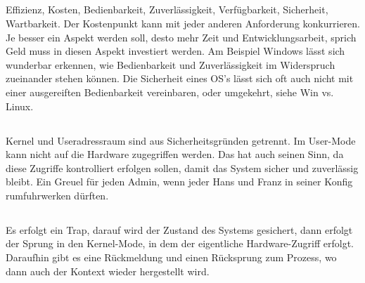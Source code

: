 \subsection{}
\begin{answer}
Effizienz, Kosten, Bedienbarkeit, Zuverlässigkeit, Verfügbarkeit, Sicherheit, Wartbarkeit.
Der Kostenpunkt kann mit jeder anderen Anforderung konkurrieren. Je besser ein Aspekt
werden soll, desto mehr Zeit und Entwicklungsarbeit, sprich Geld muss in diesen Aspekt
investiert werden. Am Beispiel Windows lässt sich wunderbar erkennen, wie Bedienbarkeit
und Zuverlässigkeit im Widerspruch zueinander stehen können. Die Sicherheit eines OS's
lässt sich oft auch nicht mit einer ausgereiften Bedienbarkeit vereinbaren, oder umgekehrt,
siehe Win vs. Linux.
\end{answer}

\subsection{}
\begin{answer}
Kernel und Useradressraum sind aus Sicherheitsgründen getrennt. Im User-Mode kann
nicht auf die Hardware zugegriffen werden. Das hat auch seinen Sinn, da diese Zugriffe
kontrolliert erfolgen sollen, damit das System sicher und zuverlässig bleibt. Ein Greuel für
jeden Admin, wenn jeder Hans und Franz in seiner Konfig rumfuhrwerken dürften.
\end{answer}

\subsection{}
\begin{answer}
Es erfolgt ein Trap, darauf wird der Zustand des Systems gesichert, dann erfolgt der Sprung
in den Kernel-Mode, in dem der eigentliche Hardware-Zugriff erfolgt. Daraufhin gibt es
eine Rückmeldung und einen Rücksprung zum Prozess, wo dann auch der Kontext wieder
hergestellt wird.
\end{answer}

